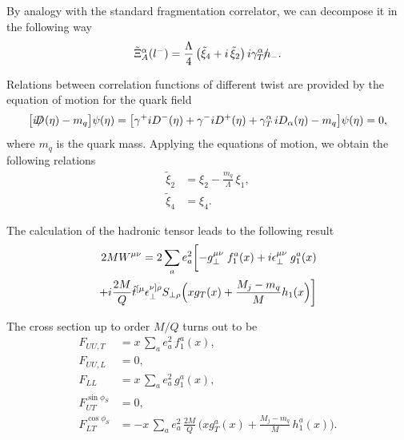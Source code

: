 \documentclass[preprintnumbers,floatfix,nofootinbib]{revtex4}
\newcommand{\todo}[1]{\marginpar{$\bullet$}\textbf{#1}}
\newcommand{\nslash}{n \hspace{-0.24cm} / \,}
\newcommand{\Dslash}{D \hspace{-0.22cm} / \,}
\newcommand{\xbj}{x}                   %
\newcommand{\ii}{i}                    %
\begin{document}
By analogy with the standard fragmentation
correlator, we can decompose it in the following way
\begin{align}
\tilde{\Xi}_{A}^{\alpha}(l^-) = 
\frac{\Lambda}{4}\,\bigl(\tilde{\xi}_4 + \ii\,\tilde{\xi}_2\bigr)\, 
\ii \gamma_T^{\alpha} \nslash_-.
\end{align} 

Relations between correlation functions of different twist are provided
by the equation of motion for the quark field
\begin{equation}
  \label{e:quark-eom}
\bigl[ \ii \! \Dslash(\eta) - m_q \bigr] \psi(\eta)
 = \bigl[ \gamma^+ \ii D^-(\eta) + \gamma^- \ii D^+(\eta) 
       + \gamma_T^\alpha\, \ii D_\alpha(\eta) 
- m_q \bigr] \psi(\eta)
 = 0 ,
\end{equation}
where $m_q$ is the quark mass. Applying the equations of motion, we obtain the
following relations
\begin{align}
\tilde{\xi}_2 &=\xi_2 -  \frac{m_q}{\Lambda}\,\xi_1,
\\
\tilde{\xi}_4  &=\xi_4.
\end{align} 

The calculation of the hadronic tensor leads to the following result
\begin{equation} 
\begin{split} 
2MW^{\mu \nu} = 2 \sum_a e_a^2 \biggl[-g_\perp^{\mu\nu}\;f_1^a(\xbj)
+i\epsilon_\perp^{\mu\nu}\;g_1^a(\xbj)
\\
+i\frac{2M}{Q}\hat{t}^{[\mu}\epsilon^{\nu]\rho}_{\perp} S_{\perp \rho}
\Bigl(\xbj g_T (\xbj) + \frac{M_j -m_q}{M} h_1(\xbj \Bigr)
\biggr]
\label{wmunu}
\end{split} 
\end{equation} 

The cross section up to order $M/Q$ turns out to be
\begin{align}
F_{UU ,T} &= \xbj\,\sum_a e_a^2\,f_1^a(\xbj),
\\
F_{UU ,L} &= 0,
\\
F_{LL} &=\xbj\,\sum_a e_a^2\,g_1^a(\xbj),
\\
F_{UT}^{\sin \phi_S}&=0,
\label{e:FUTint}
\\
F_{LT}^{\cos \phi_S}&=-\xbj\,\sum_a e_a^2\, \frac{2M}{Q}\,
\biggl(\xbj  g_T^a(\xbj)
   + \frac{M_j -m_q}{M} \, h_{1}^a(\xbj) \biggr).
\end{align}
\end{document}

